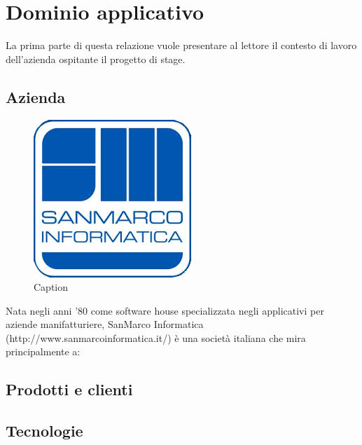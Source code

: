 
\chapter{Dominio applicativo} %

\label{Chapter1} %


La prima parte di questa relazione vuole presentare al lettore il contesto di lavoro dell'azienda ospitante il progetto di stage.


\section{Azienda}

\begin{figure}[h]\centering  
\includegraphics[scale=0.38]{../Figures/logo_sanmarco.png}
\caption[Long caption]{Caption}
\label{pic-a}
\end{figure}

Nata negli anni '80 come software house specializzata negli applicativi per aziende manifatturiere, SanMarco Informatica (http://www.sanmarcoinformatica.it/) è una società italiana che mira principalmente a:



\section{Prodotti e clienti}


\section{Tecnologie}





